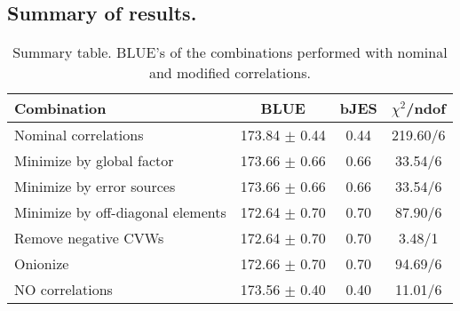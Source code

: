 \subsection{Summary of results.}
\begin{table}[h]
\scriptsize
\begin{center}
\renewcommand{\arraystretch}{1.1}
\begin{tabular}{|l|c|c|c|}
\hline
Combination & BLUE & {\tiny bJES} & {\tiny$\chi^2$/ndof} \\
\hline
Nominal correlations &     173.84 $\pm$      0.44 &       0.44 &     219.60/6\\
\hline
Minimize by global factor &     173.66 $\pm$      0.66 &       0.66 &      33.54/6\\
Minimize by error sources &     173.66 $\pm$      0.66 &       0.66 &      33.54/6\\
Minimize by off-diagonal elements &     172.64 $\pm$      0.70 &       0.70 &      87.90/6\\
Remove negative CVWs &     172.64 $\pm$      0.70 &       0.70 &       3.48/1\\
Onionize &     172.66 $\pm$      0.70 &       0.70 &      94.69/6\\
\hline
NO correlations &     173.56 $\pm$      0.40 &       0.40 &      11.01/6\\
\hline
\end{tabular}
\renewcommand{\arraystretch}{1}
\caption{Summary table. BLUE's of the combinations performed with nominal and modified correlations.}
\end{center}
\end{table}

\clearpage
